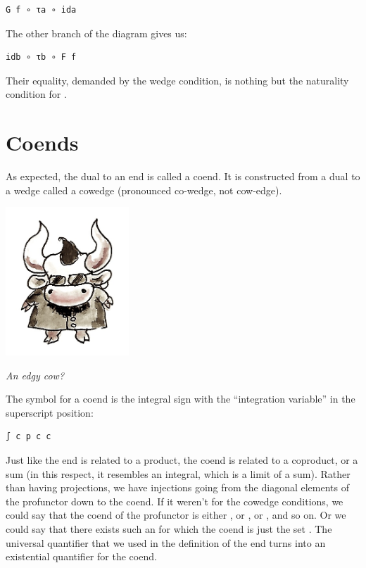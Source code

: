 \begin{verbatim}
G f ∘ τa ∘ ida
\end{verbatim}

The other branch of the diagram gives us:

\begin{verbatim}
idb ∘ τb ∘ F f
\end{verbatim}

Their equality, demanded by the wedge condition, is nothing but the
naturality condition for .

\section{Coends}\label{coends}

As expected, the dual to an end is called a coend. It is constructed
from a dual to a wedge called a cowedge (pronounced co-wedge, not
cow-edge).

\hypertarget{attachment_8533}{}
\includegraphics[width=1.82292in]{images/end-31.jpg}

\emph{An edgy cow?}

The symbol for a coend is the integral sign with the ``integration
variable'' in the superscript position:

\begin{verbatim}
∫ c p c c
\end{verbatim}

Just like the end is related to a product, the coend is related to a
coproduct, or a sum (in this respect, it resembles an integral, which is
a limit of a sum). Rather than having projections, we have injections
going from the diagonal elements of the profunctor down to the coend. If
it weren't for the cowedge conditions, we could say that the coend of
the profunctor  is either , or
, or , and so on. Or we could say that
there exists such an  for which the coend is just the set
. The universal quantifier that we used in the
definition of the end turns into an existential quantifier for the
coend.

